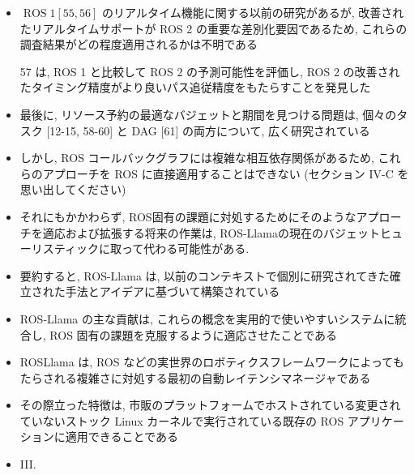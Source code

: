 {    \begin{frame}{}
        \begin{itemize}
            \item  $\operatorname{ROS} 1[55,56]$ のリアルタイム機能に関する以前の研究があるが, 改善されたリアルタイムサポートが ROS 2 の重要な差別化要因であるため, これらの調査結果がどの程度適用されるかは不明である
            \item [57] は, ROS 1 と比較して ROS 2 の予測可能性を評価し, ROS 2 の改善されたタイミング精度がより良いパス追従精度をもたらすことを発見した
        \end{itemize}
    \end{frame}

    \begin{frame}{}
        \begin{itemize}
            \item  最後に, リソース予約の最適なバジェットと期間を見つける問題は, 個々のタスク [12-15, 58-60] と DAG [61] の両方について, 広く研究されている
            \item しかし, ROS コールバックグラフには複雑な相互依存関係があるため, これらのアプローチを ROS に直接適用することはできない (セクション IV-C を思い出してください)
            \item それにもかかわらず, ROS固有の課題に対処するためにそのようなアプローチを適応および拡張する将来の作業は, ROS-Llamaの現在のバジェットヒューリスティックに取って代わる可能性がある.
        \end{itemize}
    \end{frame}

    \begin{frame}{}
        \begin{itemize}
            \item 要約すると, ROS-Llama は, 以前のコンテキストで個別に研究されてきた確立された手法とアイデアに基づいて構築されている
            \item ROS-Llama の主な貢献は, これらの概念を実用的で使いやすいシステムに統合し, ROS 固有の課題を克服するように適応させたことである
            \item ROSLlama は, ROS などの実世界のロボティクスフレームワークによってもたらされる複雑さに対処する最初の自動レイテンシマネージャである
            \item その際立った特徴は, 市販のプラットフォームでホストされている変更されていないストック Linux カーネルで実行されている既存の ROS アプリケーションに適用できることである
            \item III.
        \end{itemize}
    \end{frame}
}
